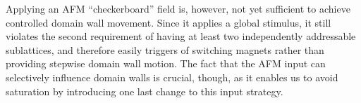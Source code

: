 Applying an AFM ``checkerboard'' field is, however, not yet sufficient to achieve controlled domain wall movement.
Since it applies a global stimulus, it still violates the second requirement of having at least two independently addressable sublattices, and therefore easily triggers  of switching magnets rather than providing stepwise domain wall motion.
The fact that the AFM input can selectively influence domain walls is crucial, though, as it enables us to avoid saturation by introducing one last change to this input strategy.


